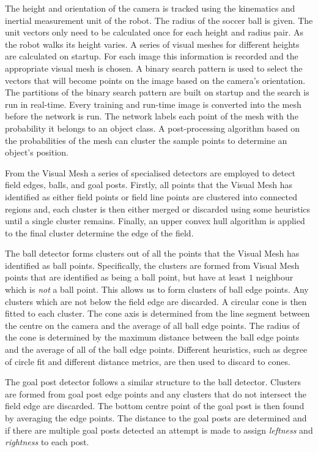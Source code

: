 \documentclass{llncs}
\begin{document}
The height and orientation of the camera is tracked using the kinematics and inertial measurement unit of the robot. The radius of the soccer ball is given. The unit vectors only need to be calculated once for each height and radius pair. As the robot walks its height varies. A series of visual meshes for different heights are calculated on startup. For each image this information is recorded and the appropriate visual mesh is chosen. A binary search pattern is used to select the vectors that will become points on the image based on the camera's orientation. The partitions of the binary search pattern are built on startup and the search is run in real-time. Every training and run-time image is converted into the mesh before the network is run. The network labels each point of the mesh with the probability it belongs to an object class. A post-processing algorithm based on the probabilities of the mesh can cluster the sample points to determine an object's position.

From the Visual Mesh a series of specialised detectors are employed to detect field edges, balls, and goal posts. Firstly, all points that the Visual Mesh has identified as either field points or field line points are clustered into connected regions and, each cluster is then either merged or discarded using some heuristics until a single cluster remains. Finally, an upper convex hull algorithm is applied to the final cluster determine the edge of the field.

The ball detector forms clusters out of all the points that the Visual Mesh has identified as ball points. Specifically, the clusters are formed from Visual Mesh points that are identified as being a ball point, but have at least $1$ neighbour which is \emph{not} a ball point. This allows us to form clusters of ball edge points. Any clusters which are not below the field edge are discarded. A circular cone is then fitted to each cluster. The cone axis is determined from the line segment between the centre on the camera and the average of all ball edge points. The radius of the cone is determined by the maximum distance between the ball edge points and the average of all of the ball edge points. Different heuristics, such as degree of circle fit and different distance metrics, are then used to discard to cones.

The goal post detector follows a similar structure to the ball detector. Clusters are formed from goal post edge points and any clusters that do not intersect the field edge are discarded. The bottom centre point of the goal post is then found by averaging the edge points. The distance to the goal posts are determined and if there are multiple goal posts detected an attempt is made to assign \emph{leftness} and \emph{rightness} to each post.
\end{document}
